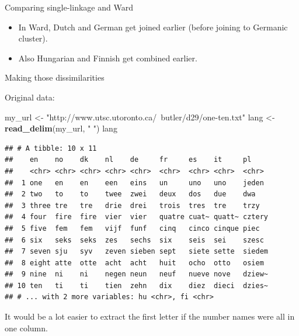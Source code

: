 \documentclass[
  ignorenonframetext,
]{beamer}
\newenvironment{Shaded}{\begin{snugshade}}{\end{snugshade}}
\newcommand{\KeywordTok}[1]{\textcolor[rgb]{0.13,0.29,0.53}{\textbf{#1}}}
\newcommand{\NormalTok}[1]{#1}
\newcommand{\StringTok}[1]{\textcolor[rgb]{0.31,0.60,0.02}{#1}}
\begin{document}
\begin{frame}{Comparing single-linkage and Ward}
\protect\hypertarget{comparing-single-linkage-and-ward}{}

\begin{itemize}
\item
  In Ward, Dutch and German get joined earlier (before joining to
  Germanic cluster).
\item
  Also Hungarian and Finnish get combined earlier.
\end{itemize}

\end{frame}

\begin{frame}[fragile]{Making those dissimilarities}
\protect\hypertarget{making-those-dissimilarities}{}

Original data:

\footnotesize

\begin{Shaded}
\begin{Highlighting}[]
\NormalTok{my_url <-}\StringTok{ "http://www.utsc.utoronto.ca/~butler/d29/one-ten.txt"}
\NormalTok{lang <-}\StringTok{ }\KeywordTok{read_delim}\NormalTok{(my_url, }\StringTok{" "}\NormalTok{)}
\NormalTok{lang}
\end{Highlighting}
\end{Shaded}

\begin{verbatim}
## # A tibble: 10 x 11
##    en    no    dk    nl    de     fr     es    it     pl    
##    <chr> <chr> <chr> <chr> <chr>  <chr>  <chr> <chr>  <chr> 
##  1 one   en    en    een   eins   un     uno   uno    jeden 
##  2 two   to    to    twee  zwei   deux   dos   due    dwa   
##  3 three tre   tre   drie  drei   trois  tres  tre    trzy  
##  4 four  fire  fire  vier  vier   quatre cuat~ quatt~ cztery
##  5 five  fem   fem   vijf  funf   cinq   cinco cinque piec  
##  6 six   seks  seks  zes   sechs  six    seis  sei    szesc 
##  7 seven sju   syv   zeven sieben sept   siete sette  siedem
##  8 eight atte  otte  acht  acht   huit   ocho  otto   osiem 
##  9 nine  ni    ni    negen neun   neuf   nueve nove   dziew~
## 10 ten   ti    ti    tien  zehn   dix    diez  dieci  dzies~
## # ... with 2 more variables: hu <chr>, fi <chr>
\end{verbatim}

\normalsize

It would be a lot easier to extract the first letter if the number names
were all in one column.

\end{frame}
\end{document}

